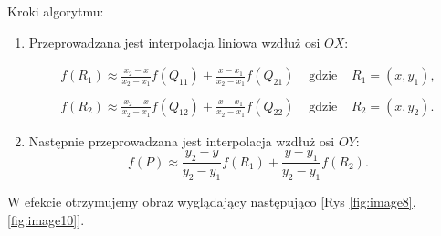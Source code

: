 \newpage
Kroki algorytmu:
\begin{enumerate}
    \item Przeprowadzana jest interpolacja liniowa wzdłuż osi $O X$:
    
    $$
    \begin{array}{llll}
    f\left(R_1\right) \approx \frac{x_2-x}{x_2-x_1} f\left(Q_{11}\right)+\frac{x-x_1}{x_2-x_1} f\left(Q_{21}\right) & \text { gdzie } & R_1=\left(x, y_1\right), \\ \\
    f\left(R_2\right) \approx \frac{x_2-x}{x_2-x_1} f\left(Q_{12}\right)+\frac{x-x_1}{x_2-x_1} f\left(Q_{22}\right) & \text { gdzie } & R_2=\left(x, y_2\right) .
    \end{array}
    $$
    \item Następnie przeprowadzana jest interpolacja wzdłuż osi $O Y$:
    $$
    f(P) \approx \frac{y_2-y}{y_2-y_1} f\left(R_1\right)+\frac{y-y_1}{y_2-y_1} f\left(R_2\right) .
    $$
\end{enumerate}


W efekcie otrzymujemy obraz wyglądający następująco [Rys \ref{fig:image8},  \ref{fig:image10}].


